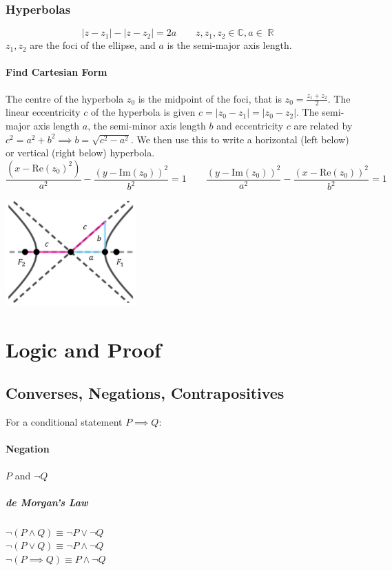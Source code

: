 \documentclass[a4paper,twoside]{article}
\DeclareMathOperator\R{\mathbb{R}}
\begin{document}
			\subsubsection{Hyperbolas}
				\[
					|z-z_1|-|z-z_2|=2a \qquad z,z_1,z_2\in\mathbb{C},a\in\R
				\]
				$z_1,z_2$ are the foci of the ellipse, and $a$ is the semi-major axis length.\\
				\begin{minipage}{0.7\textwidth}
					\paragraph{Find Cartesian Form} The centre of the hyperbola $z_0$ is the midpoint of the foci, that is $\displaystyle z_0=\frac{z_1+z_2}{2}$. The linear eccentricity $c$ of the hyperbola is given $c=|z_0-z_1|=|z_0-z_2|$. The semi-major axis length $a$, the semi-minor axis length $b$ and eccentricity $c$ are related by $c^2=a^2+b^2\implies b=\sqrt{c^2-a^2}$. We then use this to write a horizontal (left below) or vertical (right below) hyperbola.
					\[
						\frac{\left(x-\mathrm{Re}(z_0)^2\right)}{a^2}-\frac{\left(y-\mathrm{Im}(z_0)\right)^2}{b^2}=1 \qquad \frac{\left(y-\mathrm{Im}(z_0)\right)^2}{a^2}-\frac{\left(x-\mathrm{Re}(z_0)\right)^2}{b^2}=1
					\]
				\end{minipage}
				\begin{minipage}{0.3\textwidth}
					\includegraphics[width=5cm]{complexhyperbola.png}
				\end{minipage}				
	\section{Logic and Proof}
		\subsection{Converses, Negations, Contrapositives}
			For a conditional statement $P\implies Q$:
			\paragraph{Negation} $P$ and $\neg Q$
				\subparagraph{de Morgan's Law} $\neg(P\land Q)\equiv\neg P\lor\neg Q$\\
				$\neg(P\lor Q)\equiv\neg P\land\neg Q$\\
				$\neg(P\implies Q)\equiv P\land \neg Q$
\end{document}
